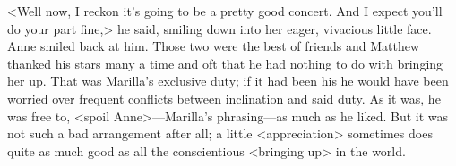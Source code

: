 <Well now, I reckon it's going to be a pretty good concert. And I expect you'll do your part fine,> he said, smiling down into her eager, vivacious little face. Anne smiled back at him. Those two were the best of friends and Matthew thanked his stars many a time and oft that he had nothing to do with bringing her up. That was Marilla's exclusive duty; if it had been his he would have been worried over frequent conflicts between inclination and said duty. As it was, he was free to, <spoil Anne>—Marilla's phrasing—as much as he liked. But it was not such a bad arrangement after all; a little <appreciation> sometimes does quite as much good as all the conscientious <bringing up> in the world.